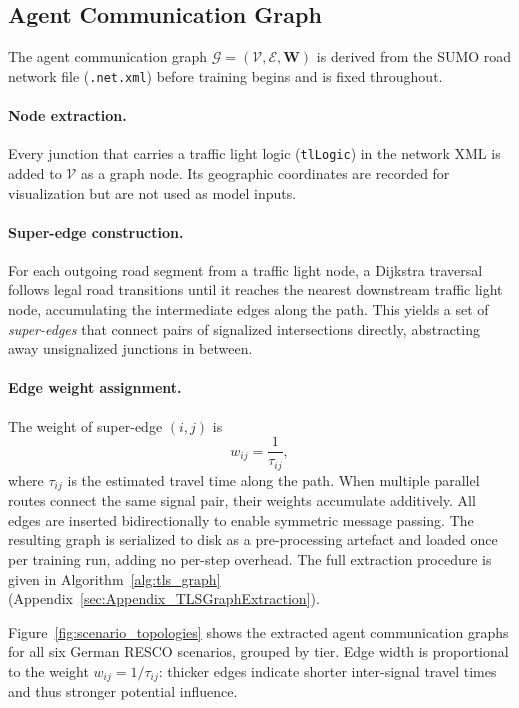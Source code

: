\subsection{Agent Communication Graph}
\label{sec:Methodology_DataPreprocessing}

The agent communication graph $\mathcal{G} = (\mathcal{V}, \mathcal{E}, \mathbf{W})$ is derived from the SUMO road network file (\texttt{.net.xml}) before training begins and is fixed throughout.

\paragraph{Node extraction.}
Every junction that carries a traffic light logic (\texttt{tlLogic}) in the network XML is added to $\mathcal{V}$ as a graph node. Its geographic coordinates are recorded for visualization but are not used as model inputs.

\paragraph{Super-edge construction.}
For each outgoing road segment from a traffic light node, a Dijkstra traversal follows legal road transitions until it reaches the nearest downstream traffic light node, accumulating the intermediate edges along the path. This yields a set of \emph{super-edges} that connect pairs of signalized intersections directly, abstracting away unsignalized junctions in between.

\paragraph{Edge weight assignment.}
The weight of super-edge $(i, j)$ is
\begin{equation}
  w_{ij} = \frac{1}{\tau_{ij}},
  \label{eq:edge_weight}
\end{equation}
where $\tau_{ij}$ is the estimated travel time along the path. When multiple parallel routes connect the same signal pair, their weights accumulate additively. All edges are inserted bidirectionally to enable symmetric message passing. The resulting graph is serialized to disk as a pre-processing artefact and loaded once per training run, adding no per-step overhead. The full extraction procedure is given in Algorithm~\ref{alg:tls_graph} (Appendix~\ref{sec:Appendix_TLSGraphExtraction}).

Figure~\ref{fig:scenario_topologies} shows the extracted agent communication graphs for all six German RESCO scenarios, grouped by tier. Edge width is proportional to the weight $w_{ij} = 1/\tau_{ij}$: thicker edges indicate shorter inter-signal travel times and thus stronger potential influence.

